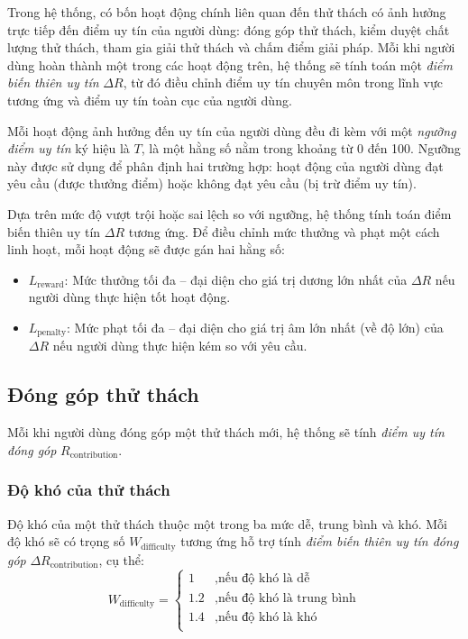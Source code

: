 Trong hệ thống, có bốn hoạt động chính liên quan đến thử thách có ảnh hưởng trực tiếp đến điểm uy tín của người dùng: đóng góp thử thách, kiểm duyệt chất lượng thử thách, tham gia giải thử thách và chấm điểm giải pháp.
Mỗi khi người dùng hoàn thành một trong các hoạt động trên, hệ thống sẽ tính toán một \textit{điểm biến thiên uy tín} $\Delta R$, từ đó điều chỉnh điểm uy tín chuyên môn trong lĩnh vực tương ứng và điểm uy tín toàn cục của người dùng.

Mỗi hoạt động ảnh hưởng đến uy tín của người dùng đều đi kèm với một \textit{ngưỡng điểm uy tín} ký hiệu là $T$, là một hằng số nằm trong khoảng từ 0 đến 100.
Ngưỡng này được sử dụng để phân định hai trường hợp: hoạt động của người dùng đạt yêu cầu (được thưởng điểm) hoặc không đạt yêu cầu (bị trừ điểm uy tín).

Dựa trên mức độ vượt trội hoặc sai lệch so với ngưỡng, hệ thống tính toán điểm biến thiên uy tín $\Delta R$ tương ứng. Để điều chỉnh mức thưởng và phạt một cách linh hoạt, mỗi hoạt động sẽ được gán hai hằng số:
\begin{itemize}
  \item $L_{\text{reward}}$: Mức thưởng tối đa -- đại diện cho giá trị dương lớn nhất của $\Delta R$ nếu người dùng thực hiện tốt hoạt động.
  \item $L_{\text{penalty}}$: Mức phạt tối đa -- đại diện cho giá trị âm lớn nhất (về độ lớn) của $\Delta R$ nếu người dùng thực hiện kém so với yêu cầu.
\end{itemize}

\subsection{Đóng góp thử thách}

Mỗi khi người dùng đóng góp một thử thách mới, hệ thống sẽ tính \textit{điểm uy tín đóng góp} $R_{\text{contribution}}$.

\subsubsection{Độ khó của thử thách}

Độ khó của một thử thách thuộc một trong ba mức dễ, trung bình và khó. Mỗi độ khó sẽ có trọng số $W_{\text{difficulty}}$ tương ứng hỗ trợ tính \textit{điểm biến thiên uy tín đóng góp} $\Delta R_{\text{contribution}}$, cụ thể:
\[
  W_{\text{difficulty}} =
  \begin{cases}
    1   & , \text{nếu độ khó là dễ}         \\
    1.2 & , \text{nếu độ khó là trung bình} \\
    1.4 & , \text{nếu độ khó là khó}        \\
  \end{cases}
\]

